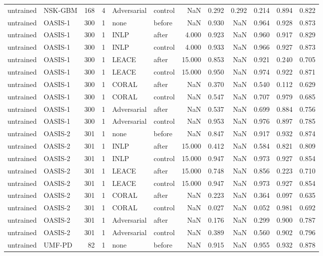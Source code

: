 \begin{tabular}{llrrllrrrrrr}
untrained & NSK-GBM & 168 & 4 & Adversarial & control & NaN & 0.292 & 0.292 & 0.214 & 0.894 & 0.822 \\
untrained & OASIS-1 & 300 & 1 & none & before & NaN & 0.930 & NaN & 0.964 & 0.928 & 0.873 \\
untrained & OASIS-1 & 300 & 1 & INLP & after & 4.000 & 0.923 & NaN & 0.960 & 0.917 & 0.829 \\
untrained & OASIS-1 & 300 & 1 & INLP & control & 4.000 & 0.933 & NaN & 0.966 & 0.927 & 0.873 \\
untrained & OASIS-1 & 300 & 1 & LEACE & after & 15.000 & 0.853 & NaN & 0.921 & 0.240 & 0.705 \\
untrained & OASIS-1 & 300 & 1 & LEACE & control & 15.000 & 0.950 & NaN & 0.974 & 0.922 & 0.871 \\
untrained & OASIS-1 & 300 & 1 & CORAL & after & NaN & 0.370 & NaN & 0.540 & 0.112 & 0.629 \\
untrained & OASIS-1 & 300 & 1 & CORAL & control & NaN & 0.547 & NaN & 0.707 & 0.979 & 0.685 \\
untrained & OASIS-1 & 300 & 1 & Adversarial & after & NaN & 0.537 & NaN & 0.699 & 0.884 & 0.756 \\
untrained & OASIS-1 & 300 & 1 & Adversarial & control & NaN & 0.953 & NaN & 0.976 & 0.897 & 0.785 \\
untrained & OASIS-2 & 301 & 1 & none & before & NaN & 0.847 & NaN & 0.917 & 0.932 & 0.874 \\
untrained & OASIS-2 & 301 & 1 & INLP & after & 15.000 & 0.412 & NaN & 0.584 & 0.821 & 0.809 \\
untrained & OASIS-2 & 301 & 1 & INLP & control & 15.000 & 0.947 & NaN & 0.973 & 0.927 & 0.854 \\
untrained & OASIS-2 & 301 & 1 & LEACE & after & 15.000 & 0.748 & NaN & 0.856 & 0.223 & 0.710 \\
untrained & OASIS-2 & 301 & 1 & LEACE & control & 15.000 & 0.947 & NaN & 0.973 & 0.927 & 0.854 \\
untrained & OASIS-2 & 301 & 1 & CORAL & after & NaN & 0.223 & NaN & 0.364 & 0.097 & 0.635 \\
untrained & OASIS-2 & 301 & 1 & CORAL & control & NaN & 0.027 & NaN & 0.052 & 0.981 & 0.692 \\
untrained & OASIS-2 & 301 & 1 & Adversarial & after & NaN & 0.176 & NaN & 0.299 & 0.900 & 0.787 \\
untrained & OASIS-2 & 301 & 1 & Adversarial & control & NaN & 0.389 & NaN & 0.560 & 0.902 & 0.796 \\
untrained & UMF-PD & 82 & 1 & none & before & NaN & 0.915 & NaN & 0.955 & 0.932 & 0.878 \\

\end{tabular}
